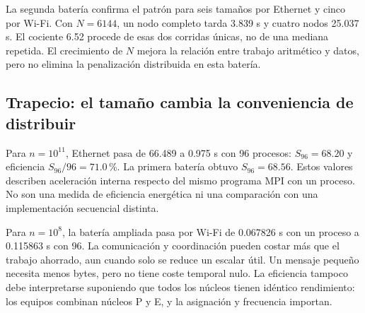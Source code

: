 
La segunda batería confirma el patrón para seis tamaños por Ethernet y cinco por Wi-Fi. Con $N=6144$, un nodo completo tarda 3.839 s y cuatro nodos 25.037 s. El cociente 6.52 procede de esas dos corridas únicas, no de una mediana repetida. El crecimiento de $N$ mejora la relación entre trabajo aritmético y datos, pero no elimina la penalización distribuida en esta batería.

\begin{table}[H]\caption{Batería ampliada: tiempos totales de matrices, en segundos. Una ejecución por configuración; el guion indica que no se ejecutó esa prueba.}

\end{table}

\subsection{Trapecio: el tamaño cambia la conveniencia de distribuir}\label{sec:trap-grande}

\begin{table}[H]\caption{Batería ampliada del trapecio. Las aceleraciones se refieren al proceso único de la misma red.}

\end{table}

Para $n=10^{11}$, Ethernet pasa de 66.489 a 0.975 s con 96 procesos: $S_{96}=68.20$ y eficiencia $S_{96}/96=71.0$\,\%. La primera batería obtuvo $S_{96}=68.56$. Estos valores describen aceleración interna respecto del mismo programa MPI con un proceso. No son una medida de eficiencia energética ni una comparación con una implementación secuencial distinta.

Para $n=10^8$, la batería ampliada pasa por Wi-Fi de 0.067826 s con un proceso a 0.115863 s con 96. La comunicación y coordinación pueden costar más que el trabajo ahorrado, aun cuando solo se reduce un escalar útil. Un mensaje pequeño necesita menos bytes, pero no tiene coste temporal nulo. La eficiencia tampoco debe interpretarse suponiendo que todos los núcleos tienen idéntico rendimiento: los equipos combinan núcleos P y E, y la asignación y frecuencia importan.


